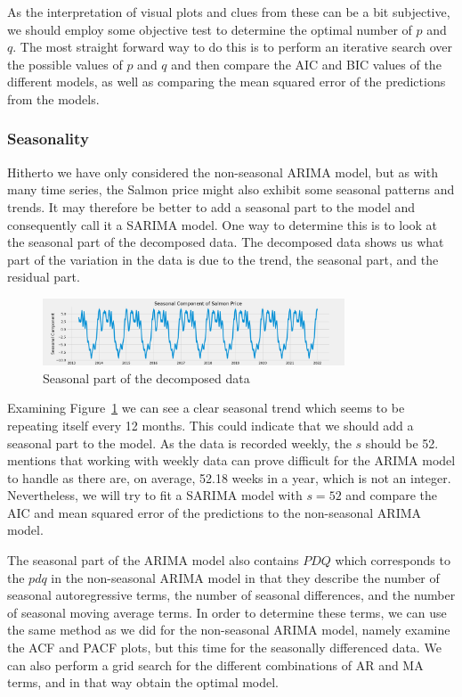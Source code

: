 As the interpretation of visual plots and clues from these can be a bit subjective, we should employ some objective test to determine the optimal number of $p$ and $q$. The most straight forward way to do this is to perform an iterative search over the possible values of $p$ and $q$ and then compare the AIC and BIC values of the different models, as well as comparing the mean squared error of the predictions from the models.  

\subsubsection{Seasonality}
Hitherto we have only considered the non-seasonal ARIMA model, but as with many time series, the Salmon price might also exhibit some seasonal patterns and trends. It may therefore be better to add a seasonal part to the model and consequently call it a SARIMA model. One way to determine this is to look at the seasonal part of the decomposed data. The decomposed data shows us what part of the variation in the data is due to the trend, the seasonal part, and the residual part.
\begin{figure}[H]
    \centering
    \includegraphics[width=0.8\textwidth]{data/Figures/ARIMA/SeasonalDecompose.png}
    \caption[Seasonal part of the decomposed data]{Seasonal part of the decomposed data}\label{fig:SeasonalDecompose}
\end{figure}

Examining Figure~\ref{fig:SeasonalDecompose} we can see a clear seasonal trend which seems to be repeating itself every 12 months. This could indicate that we should add a seasonal part to the model. As the data is recorded weekly, the $s$ should be 52. \textcite{hyndman_athanasopoulos_2021} mentions that working with weekly data can prove difficult for the ARIMA model to handle as there are, on average, 52.18 weeks in a year, which is not an integer. Nevertheless, we will try to fit a SARIMA model with $s=52$ and compare the AIC and mean squared error of the predictions to the non-seasonal ARIMA model. 

The seasonal part of the ARIMA model also contains $PDQ$ which corresponds to the $pdq$ in the non-seasonal ARIMA model in that they describe the number of seasonal autoregressive terms, the number of seasonal differences, and the number of seasonal moving average terms. In order to determine these terms, we can use the same method as we did for the non-seasonal ARIMA model, namely examine the ACF and PACF plots, but this time for the seasonally differenced data. We can also perform a grid search for the different combinations of AR and MA terms, and in that way obtain the optimal model.


